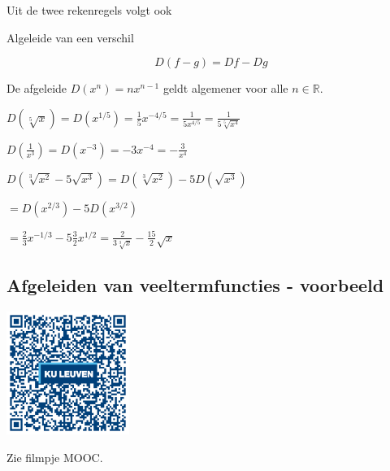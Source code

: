 Uit de twee rekenregels volgt ook
\begin{eigenschap} Algeleide van een verschil
	
\[D(f-g)=Df-Dg\]
\end{eigenschap}\vspace{5 mm}
\begin{eigenschap}
	De afgeleide $D(x^n)=nx^{n-1}$ geldt algemener voor alle $n\in \mathbb{R}$.
\end{eigenschap}

\begin{voorbeeld}
	$D(\sqrt[5]{x})=D(x^{1/5})=\frac{1}{5}x^{-4/5}=\frac{1}{5x^{4/5}}=\frac{1}{5\sqrt[5]{x^4}}$
\end{voorbeeld}

\begin{voorbeeld}
	$D(\frac{1}{x^3})=D(x^{-3})=-3x^{-4}=-\frac{3}{x^4}$
\end{voorbeeld}

\begin{voorbeeld}
	$D(\sqrt[3]{x^2}-5\sqrt{x^3})=D(\sqrt[3]{x^2})-5D(\sqrt{x^3})$
	
	\hspace{5mm} $=D(x^{2/3})-5D(x^{3/2})$
	
	\hspace{5mm} $=\frac{2}{3}x^{-1/3}-5\frac{3}{2}x^{1/2}=\frac{2}{3\sqrt[3]{x}}-\frac{15}{2}\sqrt{x}$
\end{voorbeeld}

\subsection{Afgeleiden van veeltermfuncties - voorbeeld}

\begin{minipage}{.25\linewidth}
	\raggedright
	\includegraphics[width=4cm]{6_afgeleiden_integralen/inputs/QR_Code_AFGVTFTIES_module6new}
\end{minipage}
\begin{minipage}{.7\linewidth}
	Zie filmpje MOOC.
\end{minipage}

